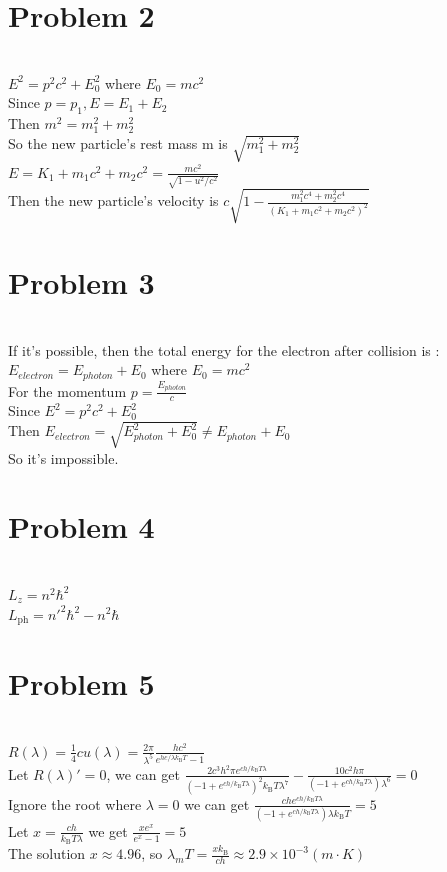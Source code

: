 \documentclass[a4paper]{article}
\begin{document}
\section{Problem 2} 
\quad 
\\$E^2=p^2c^2+E_0^2$ where $E_0=mc^2$
\\Since $p=p_1,E=E_1+E_2$
\\Then $m^2=m_1^2+m_2^2$
\\So the new particle's rest mass m is $\sqrt{m_1^2+m_2^2}$
\\$E=K_1+m_1c^2+m_2c^2=\frac{mc^2}{\sqrt{1-u^2/c^2}}$
\\Then the new particle's velocity is $c\sqrt{1-\frac{m_1^2c^4+m_2^2c^4}{(K_1+m_1c^2+m_2c^2)^2}}$
\section{Problem 3}
\quad
\\If it's possible, then the total energy for the electron after collision is :
\\$E_{electron}=E_{photon}+E_{0}$ where $E_0=mc^2$
\\For the momentum $p=\frac{E_{photon}}{c}$
\\Since $E^2=p^2c^2+E_0^2$
\\Then $E_{electron}=\sqrt{E_{photon}^2+E_{0}^2}\neq E_{photon}+E_{0}$
\\So it's impossible.
\section{Problem 4}
\quad
\\$L_z=n^2\hbar^2$
\\$L_{\mathrm{ph}}=n'^2\hbar^2-n^2\hbar$
\section{Problem 5}
\quad
\\$R(\lambda)=\frac{1}{4}cu(\lambda)=\frac{2\pi}{\lambda^5}\frac{hc^2}{e^{hc/\lambda k_\mathrm{B}T}-1}$
\\Let $R(\lambda)'=0$, we can get $\frac{2c^3h^2\pi e^{ch/k_\mathrm{B}T\lambda}}{(-1+e^{ch/k_\mathrm{B}T\lambda})^2 k_\mathrm{B}T\lambda^7}-\frac{10c^2h\pi}{(-1+e^{ch/k_\mathrm{B}T\lambda})\lambda^6}=0$
\\Ignore the root where $\lambda=0$ we can get $\frac{che^{ch/k_\mathrm{B}T\lambda}}{(-1+e^{ch/k_\mathrm{B}T\lambda})\lambda k_\mathrm{B}T}=5$
\\Let $x=\frac{ch}{k_\mathrm{B}T\lambda}$ we get $\frac{xe^x}{e^x-1}=5$
\\The solution $x\approx4.96$, so $\lambda_mT=\frac{xk_\mathrm{B}}{ch}\approx2.9\times10^{-3}(m\cdot K)$
\end{document}
